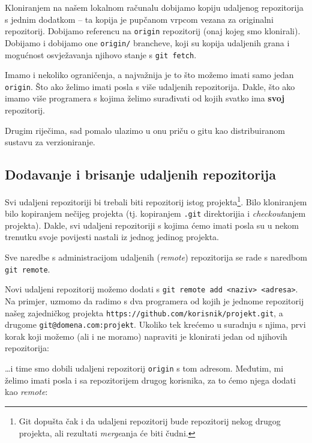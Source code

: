 Kloniranjem na našem lokalnom računalu dobijamo kopiju udaljenog repozitorija s jednim dodatkom -- ta kopija je pupčanom vrpcom vezana za originalni repozitorij.
Dobijamo referencu na \verb+origin+ repozitorij (onaj kojeg smo klonirali).
Dobijamo i dobijamo one \verb+origin/+ brancheve, koji su kopija udaljenih grana i mogućnost osvježavanja njihovo stanje s \verb+git fetch+.

Imamo i nekoliko ograničenja, a najvažnija je to što možemo imati samo jedan \verb+origin+.
Što ako želimo imati posla s više udaljenih repozitorija.
Dakle, što ako imamo više programera s kojima želimo surađivati od kojih svatko ima \textbf{svoj} repozitorij.

Drugim riječima, sad pomalo ulazimo u onu priču o gitu kao distribuiranom sustavu za verzioniranje.

\subsection*{Dodavanje i brisanje udaljenih repozitorija}

Svi udaljeni repozitoriji bi trebali biti repozitorij istog projekta\footnote{Git dopušta čak i da udaljeni repozitorij bude repozitorij nekog drugog projekta, ali rezultati \emph{merge}anja će biti čudni.}. 
Bilo kloniranjem bilo kopiranjem nečijeg projekta (tj. kopiranjem \verb+.git+ direktorijia i \emph{checkout}anjem projekta).
Dakle, svi udaljeni repozitoriji s kojima ćemo imati posla su u nekom trenutku svoje povijesti nastali iz jednog jedinog projekta.

Sve naredbe s administracijom udaljenih (\emph{remote}) repozitorija se rade s naredbom \\ \verb+git remote+.

Novi udaljeni repozitorij možemo dodati s \verb+git remote add <naziv> <adresa>+.
Na primjer, uzmomo da radimo s dva programera od kojih je jednome repozitorij našeg zajedničkog projekta \verb+https://github.com/korisnik/projekt.git+, a drugome \verb+git@domena.com:projekt+.
Ukoliko tek krećemo u suradnju s njima, prvi korak koji možemo (ali i ne moramo) napraviti je klonirati jedan od njihovih repozitorija:


\dots{}i time smo dobili udaljeni repozitorij \verb+origin+ s tom adresom.
Međutim, mi želimo imati posla i sa repozitorijem drugog korisnika, za to ćemo njega dodati kao \emph{remote}:

